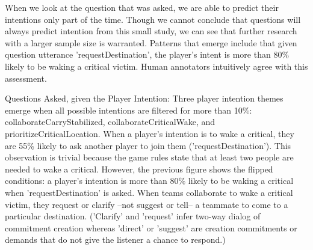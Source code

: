 When we look at the question that was asked, we are able to predict their intentions only part of the time. Though we cannot conclude that questions will always predict intention from this small study, we can see that further research with a larger sample size is warranted. Patterns that emerge include that given question utterance 'requestDestination', the player's intent is more than 80\% likely to be waking a critical victim. Human annotators intuitively agree with this assessment.






Questions Asked, given the Player Intention: Three player intention themes emerge when all possible intentions are filtered for more than 10\%: collaborateCarryStabilized, collaborateCriticalWake, and prioritizeCriticalLocation. When a player's intention is to wake a critical, they are 55\% likely to ask another player to join
 them ('requestDestination'). This observation is trivial because the game rules state that at least two people are needed to wake a critical. However, the previous figure shows the flipped conditions: a player's intention is more than 80\% likely to be waking a critical when 'requestDestination' is asked. When teams collaborate to wake a critical victim, they request or clarify --not suggest or tell-- a teammate to come to a particular destination. ('Clarify' and 'request' infer two-way dialog of commitment creation whereas 'direct' or 'suggest' are creation commitments or demands that do not give the listener a chance to respond.) 








